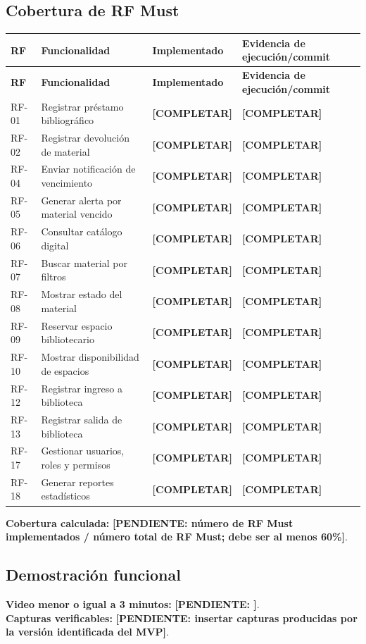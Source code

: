 \documentclass[12pt,journal,onecolumn]{IEEEtran}
\newcommand{\pendiente}[1]{\textcolor{red!70!black}{\textbf{[PENDIENTE: #1]}}}
\newcommand{\completar}{\textcolor{red!70!black}{\textbf{[COMPLETAR]}}}
\begin{document}
\subsection{Cobertura de RF Must}
\begin{longtable}{P{0.10\textwidth}P{0.36\textwidth}P{0.15\textwidth}P{0.31\textwidth}}\toprule
\textbf{RF} & \textbf{Funcionalidad} & \textbf{Implementado} & \textbf{Evidencia de ejecución/commit}\\\midrule\endfirsthead
\toprule\textbf{RF} & \textbf{Funcionalidad} & \textbf{Implementado} & \textbf{Evidencia de ejecución/commit}\\\midrule\endhead
RF-01 & Registrar préstamo bibliográfico & \completar & \completar\\
RF-02 & Registrar devolución de material & \completar & \completar\\
RF-04 & Enviar notificación de vencimiento & \completar & \completar\\
RF-05 & Generar alerta por material vencido & \completar & \completar\\
RF-06 & Consultar catálogo digital & \completar & \completar\\
RF-07 & Buscar material por filtros & \completar & \completar\\
RF-08 & Mostrar estado del material & \completar & \completar\\
RF-09 & Reservar espacio bibliotecario & \completar & \completar\\
RF-10 & Mostrar disponibilidad de espacios & \completar & \completar\\
RF-12 & Registrar ingreso a biblioteca & \completar & \completar\\
RF-13 & Registrar salida de biblioteca & \completar & \completar\\
RF-17 & Gestionar usuarios, roles y permisos & \completar & \completar\\
RF-18 & Generar reportes estadísticos & \completar & \completar\\
\bottomrule\end{longtable}
\textbf{Cobertura calculada:} \pendiente{número de RF Must implementados / número total de RF Must; debe ser al menos 60\%}.

\subsection{Demostración funcional}
\textbf{Video menor o igual a 3 minutos:} \pendiente{}.\\
\textbf{Capturas verificables:} \pendiente{insertar capturas producidas por la versión identificada del MVP}.
\end{document}

